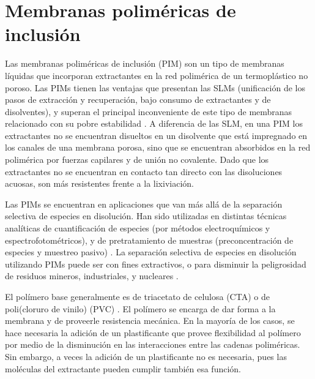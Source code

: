 
\section{Membranas poliméricas de inclusión}\label{sec:pimint}
Las membranas poliméricas de inclusión (PIM) son un tipo de membranas líquidas que incorporan extractantes en la red polimérica de un termoplástico no poroso. Las \ac{PIM}s tienen las ventajas que presentan las \ac{SLM}s (unificación de los pasos de extracción y recuperación, bajo consumo de extractantes y de disolventes), y superan el principal inconveniente de este tipo de membranas relacionado con su pobre estabilidad \citep{Nghiem2006}. A diferencia de las SLM, en una PIM los extractantes no se encuentran disueltos en un disolvente que está impregnado en los canales de una membrana porosa, sino que se encuentran absorbidos en la red polimérica por fuerzas capilares y de unión no covalente. Dado que los extractantes no se encuentran en contacto tan directo con las disoluciones acuosas, son más resistentes frente a la lixiviación. 

Las \ac{PIM}s se encuentran en aplicaciones que van más allá de la separación selectiva de especies en disolución. Han sido utilizadas en distintas técnicas analíticas de cuantificación de especies (por métodos electroquímicos y espectrofotométricos), y de pretratamiento de muestras (preconcentración de especies y muestreo pasivo) \citep{ALMEIDA2017}. La separación selectiva de especies en disolución utilizando PIMs puede ser con fines extractivos, o para disminuir la peligrosidad de residuos mineros, industriales, y nucleares \citep{Kolev2019}.

El polímero base generalmente es de triacetato de celulosa (CTA)  o de poli(cloruro de vinilo) (PVC) . El polímero se encarga de dar forma a la membrana y de proveerle resistencia mecánica. En la mayoría de los casos, se hace necesaria la adición de un plastificante que provee flexibilidad al polímero por medio de la disminución en las interacciones entre las cadenas poliméricas. Sin embargo, a veces la adición de un plastificante no es necesaria, pues las moléculas del extractante pueden cumplir también esa función. 

    
